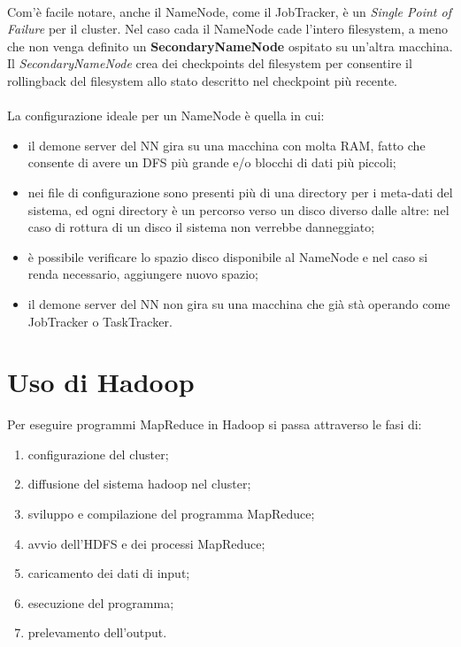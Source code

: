 \documentclass[a4paper,11pt]{report}
\begin{document}
\paragraph{}
Com'è facile notare, anche il NameNode, come il JobTracker, è un \emph{Single Point of Failure} per il cluster. Nel caso cada il NameNode
cade l'intero filesystem, a meno che non venga
definito un \textbf{SecondaryNameNode} ospitato su un'altra macchina. Il \emph{SecondaryNameNode} crea dei checkpoints del filesystem per
consentire il rollingback del filesystem allo 
stato descritto nel checkpoint più recente.
\paragraph{}
La configurazione ideale per un NameNode è quella in cui:
\begin{itemize}
 \item il demone server del NN gira su una macchina con molta RAM, fatto che consente di avere un DFS più grande e/o blocchi di dati più
piccoli;
 \item nei file di configurazione sono presenti più di una directory per i meta-dati del sistema, ed ogni directory è un percorso verso un
disco diverso dalle altre: nel caso
di rottura di un disco il sistema non verrebbe danneggiato;
 \item è possibile verificare lo spazio disco disponibile al NameNode e nel caso si renda necessario, aggiungere nuovo spazio;
 \item il demone server del NN non gira su una macchina che già stà operando come JobTracker o TaskTracker.
\end{itemize}
\section{Uso di Hadoop}
Per eseguire programmi MapReduce in Hadoop si passa attraverso le fasi di:
\begin{enumerate}
 \item configurazione del cluster;
 \item diffusione del sistema hadoop nel cluster;
 \item sviluppo e compilazione del programma MapReduce;
 \item avvio dell'HDFS e dei processi MapReduce;
 \item caricamento dei dati di input;
 \item esecuzione del programma;
 \item prelevamento dell'output.
\end{enumerate}
\end{document}
